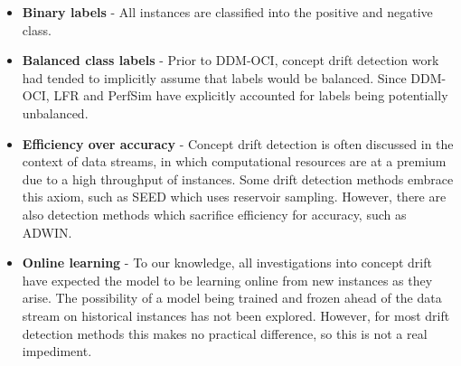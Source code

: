 \begin{itemize}
  \item {\bf Binary labels} - All instances are classified into the positive and negative class.
  \item {\bf Balanced class labels} - Prior to DDM-OCI, concept drift detection work had tended to implicitly assume that labels would be balanced. Since DDM-OCI, LFR and PerfSim have explicitly accounted for labels being potentially unbalanced.
  \item {\bf Efficiency over accuracy} - Concept drift detection is often discussed in the context of data streams, in which computational resources are at a premium due to a high throughput of instances. Some drift detection methods embrace this axiom, such as SEED which uses reservoir sampling. However, there are also detection methods which sacrifice efficiency for accuracy, such as ADWIN.
  \item {\bf Online learning} - To our knowledge, all investigations into concept drift have expected the model to be learning online from new instances as they arise. The possibility of a model being trained and frozen ahead of the data stream on historical instances has not been explored. However, for most drift detection methods this makes no practical difference, so this is not a real impediment.
\end{itemize}

